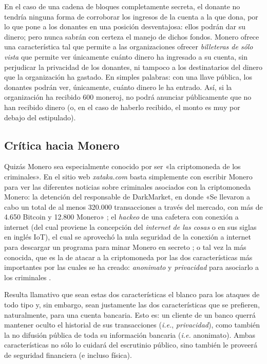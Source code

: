 \documentclass[12pt,a4paper,twoside]{book}
\begin{document}
En el caso de una cadena de bloques completamente secreta, el donante no tendría ninguna forma de corroborar los ingresos de la cuenta a la que dona, por lo que pone a los donantes en una posición desventajosa: ellos podrán dar su dinero; pero nunca sabrán con certeza el manejo de dichos fondos. Monero ofrece una característica tal que permite a las organizaciones ofrecer \textit{billeteras de sólo vista} que permite ver únicamente cuánto dinero ha ingresado a su cuenta, sin perjudicar la privacidad de los donantes, ni tampoco a los destinatarios del dinero que la organización ha gastado. En simples palabras: con una llave pública, los donantes podrán ver, únicamente, cuánto dinero le ha entrado. Así, si la organización ha recibido 600 moneroj, no podrá anunciar públicamente que no han recibido dinero (o, en el caso de haberlo recibido, el monto es muy por debajo del estipulado).

\subsection{Crítica hacia Monero}
Quizás Monero sea especialmente conocido por ser «la criptomoneda de los criminales». En el sitio web \textit{xataka.com} basta simplemente con escribir Monero para ver las diferentes noticias sobre criminales asociados con la criptomoneda Monero: la detención del responsable de DarkMarket, en donde «Se llevaron a cabo un total de al menos 320.000 transacciones a través del mercado, con más de 4.650 Bitcoin y 12.800 Monero» \cite{xataka:darkmarket}; el \textit{hackeo} de una cafetera con conexión a internet (del cual proviene la concepción del \textit{internet de las cosas} o en sus siglas en inglés IoT), el cual se aprovechó la nula seguridad de la conexión a internet para descargar un programa para minar Monero en secreto \cite{xataka:cafetera}; o tal vez la más conocida, que es la de atacar a la criptomoneda por las dos características más importantes por las cuales se ha creado: \textit{anonimato} y \textit{privacidad} para asociarlo a los criminales \cite{xataka:monero}.

Resulta llamativo que sean estas dos características el blanco para los ataques de todo tipo y, sin embargo, sean justamente las dos características que se prefieren, naturalmente, para una cuenta bancaria. Esto es: un cliente de un banco querrá mantener oculto el historial de sus transacciones (\textit{i.e.}, \textit{privacidad}), como también la no difusión pública de toda su información bancaria (\textit{i.e.} anonimato). Ambas características no sólo lo cuidará del escrutinio público, sino también le proveerá de seguridad financiera (e incluso física).
\end{document}
